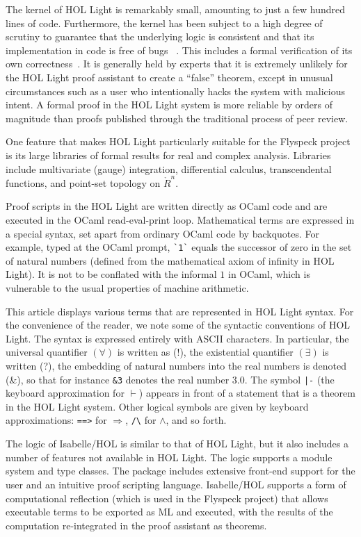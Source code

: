 The kernel of HOL Light is remarkably small, amounting to just a few
hundred lines of code.  Furthermore, the kernel has been subject to a
high degree of scrutiny to guarantee that the underlying logic is
consistent and that its implementation in code is free of
bugs~\cite{DBLP:conf/itp/KumarAMO14} \cite{hales-bourbaki2014}.  This
includes a formal verification of its own
correctness~\cite{DBLP:conf/cade/Harrison06}.  It is generally held by
experts that it is extremely unlikely for the HOL Light proof
assistant to create a ``false'' theorem, except in unusual
circumstances such as a user who intentionally hacks the system with
malicious intent.  A formal proof in the HOL Light system is more
reliable by orders of magnitude than proofs published through the
traditional process of peer review.

One feature that makes HOL Light particularly suitable for the
Flyspeck project is its large libraries of formal results for real and
complex analysis.  Libraries include multivariate (gauge) integration,
differential calculus, transcendental functions, and point-set
topology on $\ring{R}^n$.

Proof scripts in the HOL Light are written directly as OCaml code and
are executed in the OCaml read-eval-print loop.  Mathematical
terms are expressed in a special syntax, set apart from ordinary OCaml
code by backquotes.  For example, typed at the OCaml prompt,
\verb!`1`!  equals the successor of zero in the set of natural numbers
(defined from the mathematical axiom of infinity in HOL Light).
It is not to be conflated with the informal $1$ in OCaml, which is
vulnerable to the usual properties of machine arithmetic.

This article displays various terms that are represented in HOL Light
syntax.  For the convenience of the reader, we note some of the
syntactic conventions of HOL Light.  The syntax is expressed entirely
with ASCII characters.  In particular, the universal
quantifier $(\forall)$ is written as (!), the existential quantifier
$(\exists)$ is written (?), the embedding of natural numbers into the
real numbers is denoted (\&), so that for instance \verb!&3! denotes
the real number $3.0$.  The symbol \verb!|-! (the keyboard
approximation for $\vdash$) appears in front of a statement that is a
theorem in the HOL Light system.  Other logical symbols are given by
keyboard approximations: \verb!==>! for $\Longrightarrow$, \verb!/\!
for $\land$, and so forth.

The logic of Isabelle/HOL is similar to that of HOL Light, but it
also includes a number of features not available in HOL Light.  The logic
supports a module system and type classes.  The package includes
extensive front-end support for the user and an intuitive proof
scripting language.  Isabelle/HOL supports a form of computational
reflection (which is used in the Flyspeck project) that allows
executable terms to be exported as ML and executed, with the results
of the computation re-integrated in the proof assistant as theorems.


